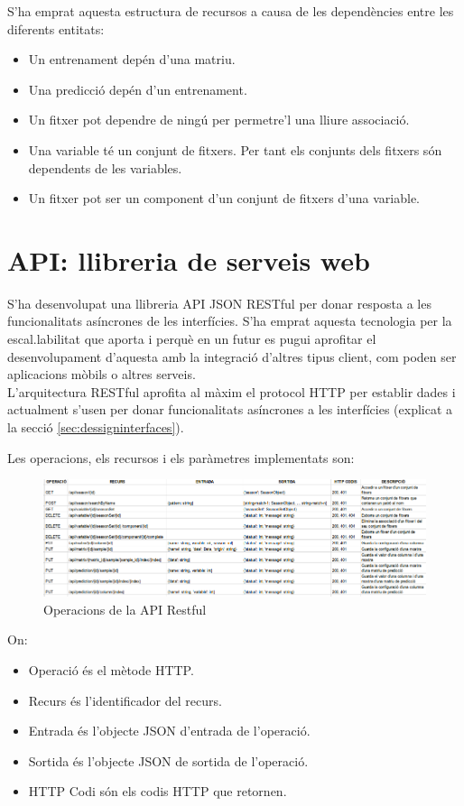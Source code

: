S'ha emprat aquesta estructura de recursos a causa de les dependències entre les diferents entitats:
\begin{itemize}
\item Un entrenament dep\'{e}n d'una matriu.
\item Una predicci\'{o} dep\'{e}n d'un entrenament.
\item Un fitxer pot dependre de ningú per permetre'l una lliure associació.
\item Una variable t\'{e} un conjunt de fitxers. Per tant els conjunts dels fitxers s\'{o}n dependents de les variables.
\item Un fitxer pot ser un component d'un conjunt de fitxers d'una variable.
\end{itemize}

\section{API: llibreria de serveis web}
S'ha desenvolupat una llibreria API JSON RESTful per donar resposta a les funcionalitats asíncrones de les interfícies.\cite{apijson} S'ha emprat aquesta tecnologia per la escal.labilitat que aporta i perquè en un futur es pugui aprofitar el desenvolupament d'aquesta amb la integració d'altres tipus client, com poden ser aplicacions mòbils o altres serveis.\\

L'arquitectura RESTful aprofita al màxim el protocol HTTP per establir dades i actualment s'usen per donar funcionalitats asíncrones a les interfícies (explicat a la secció \ref{sec:dessigninterfaces}).

Les operacions, els recursos i els paràmetres implementats son:\\
\begin{figure}[H]
  \includegraphics[scale=0.5]{img/implementation/apirestul.png}
  \caption{Operacions de la API Restful}
  \label{fig:apirestful}
\end{figure}
On:
\begin{itemize}
\item Operació \'{e}s el mètode HTTP.
\item Recurs \'{e}s l'identificador del recurs.
\item Entrada \'{e}s l'objecte JSON d'entrada de l'operació.
\item Sortida \'{e}s l'objecte JSON de sortida de l'operació.
\item HTTP Codi s\'{o}n els codis HTTP que retornen.\cite{listhttpcodis}
\end{itemize}

